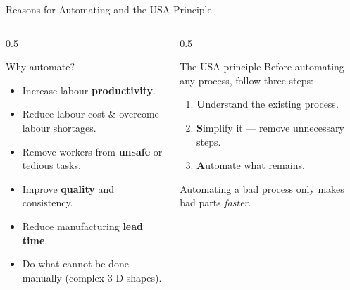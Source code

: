 \documentclass[aspectratio=169]{beamer}
\begin{document}
	\begin{frame}{Reasons for Automating and the USA Principle}
		\begin{columns}[T]
			\begin{column}{0.5\textwidth}
				\begin{block}{Why automate?}
					\begin{itemize}\small
						\item Increase labour \textbf{productivity}.
						\item Reduce labour cost \& overcome labour shortages.
						\item Remove workers from \textbf{unsafe} or tedious tasks.
						\item Improve \textbf{quality} and consistency.
						\item Reduce manufacturing \textbf{lead time}.
						\item Do what cannot be done manually (complex 3-D shapes).
					\end{itemize}
				\end{block}
			\end{column}
			\begin{column}{0.5\textwidth}
				\begin{block}{The USA principle}
					Before automating any process, follow three steps:
					\begin{enumerate}\small
						\item \textbf{U}nderstand the existing process.
						\item \textbf{S}implify it --- remove unnecessary steps.
						\item \textbf{A}utomate what remains.
					\end{enumerate}
				\end{block}
				\vspace{0.1cm}
				\footnotesize Automating a bad process only makes bad parts \emph{faster}.
			\end{column}
		\end{columns}
	\end{frame}
\end{document}
